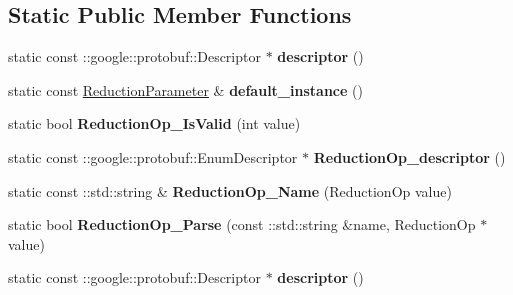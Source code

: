 \subsection*{Static Public Member Functions}
\begin{DoxyCompactItemize}
\item 
\mbox{\label{classcaffe_1_1_reduction_parameter_a6eaa819cebbd146ae07dd83f545a28e5}} 
static const \+::google\+::protobuf\+::\+Descriptor $\ast$ {\bfseries descriptor} ()
\item 
\mbox{\label{classcaffe_1_1_reduction_parameter_aff553b2b7cb148b92e57c3646aa47437}} 
static const \mbox{\hyperlink{classcaffe_1_1_reduction_parameter}{Reduction\+Parameter}} \& {\bfseries default\+\_\+instance} ()
\item 
\mbox{\label{classcaffe_1_1_reduction_parameter_a9676849fdfc7c6088b10c4de7f19e901}} 
static bool {\bfseries Reduction\+Op\+\_\+\+Is\+Valid} (int value)
\item 
\mbox{\label{classcaffe_1_1_reduction_parameter_a096eb64c4791168ddf50d3ff603d9f16}} 
static const \+::google\+::protobuf\+::\+Enum\+Descriptor $\ast$ {\bfseries Reduction\+Op\+\_\+descriptor} ()
\item 
\mbox{\label{classcaffe_1_1_reduction_parameter_aa283a046933d6f0c2f7ac29c93903e95}} 
static const \+::std\+::string \& {\bfseries Reduction\+Op\+\_\+\+Name} (Reduction\+Op value)
\item 
\mbox{\label{classcaffe_1_1_reduction_parameter_ab653ee0ececb681924d236417c3bc809}} 
static bool {\bfseries Reduction\+Op\+\_\+\+Parse} (const \+::std\+::string \&name, Reduction\+Op $\ast$value)
\item 
\mbox{\label{classcaffe_1_1_reduction_parameter_af360e00dd8d14d4321213a639dfa0750}} 
static const \+::google\+::protobuf\+::\+Descriptor $\ast$ {\bfseries descriptor} ()
\item 
\mbox{\label{classcaffe_1_1_reduction_parameter_afe7aab4747593630e11b54f9bd47188a}} 

\end{DoxyCompactItemize}
